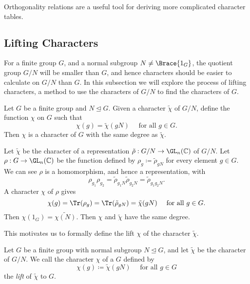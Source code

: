\documentclass[../Project.tex]{subfiles}
\begin{document}
Orthogonality relations are a useful tool for deriving more complicated character tables.

\newpage
\subsection{Lifting Characters}
For a finite group $G$, and a normal subgroup $N \neq \Brace{1_G}$, the quotient group $G/N$ will be smaller than $G$, and hence characters should be easier to calculate on $G/N$ than $G$. In this subsection we will explore the process of lifting characters, a method to use the characters of $G/N$ to find the characters of $G$.\\

\begin{prop}[{\cite[Proposition 17.1]{2}}]
	Let $G$ be a finite group and $N \trianglelefteq G$. Given a character $\tilde{\chi}$ of $G/N$, define the function $\chi$ on $G$ such that
	$$\chi(g) = \tilde{\chi}(gN) \quad \text{ for all } g \in G.$$
	Then $\chi$ is a character of $G$ with the same degree as $\tilde{\chi}$.
\end{prop}
\begin{proo*}[{\cite[Proposition 17.1]{2}}]
	Let $\tilde{\chi}$ be the character of a representation $\tilde\rho : G/N \to \GL_n(\mathbb{C})$ of $G/N$. Let $\rho : G \to \GL_n(\mathbb{C})$ be the function defined by $\rho_g \coloneqq \tilde{\rho}_{gN}$ for every element $g \in G$. We can see $\rho$ is a homomorphism, and hence a representation, with
	$$\rho_{g_1}\rho_{g_2} = \tilde{\rho}_{g_1N}\tilde{\rho}_{g_2N} = \tilde{\rho}_{g_1g_2N}.$$
	A character $\chi$ of $\rho$ gives
	$$\chi(g) = \Tr(\rho_g) = \Tr(\tilde{\rho}_{gN}) = \tilde{\chi}(gN)\quad \text{ for all } g \in G.$$
	Then $\chi({1_G}) =\tilde{\chi(N)}$. Then $\chi$ and $\tilde{\chi}$ have the same degree.\\
\end{proo*}

This motivates us to formally define the lift $\chi$ of the character $\tilde{\chi}$.

\begin{defi}
	Let $G$ be a finite group with normal subgroup $N \trianglelefteq G$, and let $\tilde{\chi}$ be the character of $G/N$. We call the character $\chi$ of a $G$ defined by 
	$$\chi(g) \coloneqq \tilde{\chi}(gN) \quad \text{ for all } g \in G$$
	the \textit{lift} of $\tilde{\chi}$ to $G$.\\
\end{defi}
\end{document}
